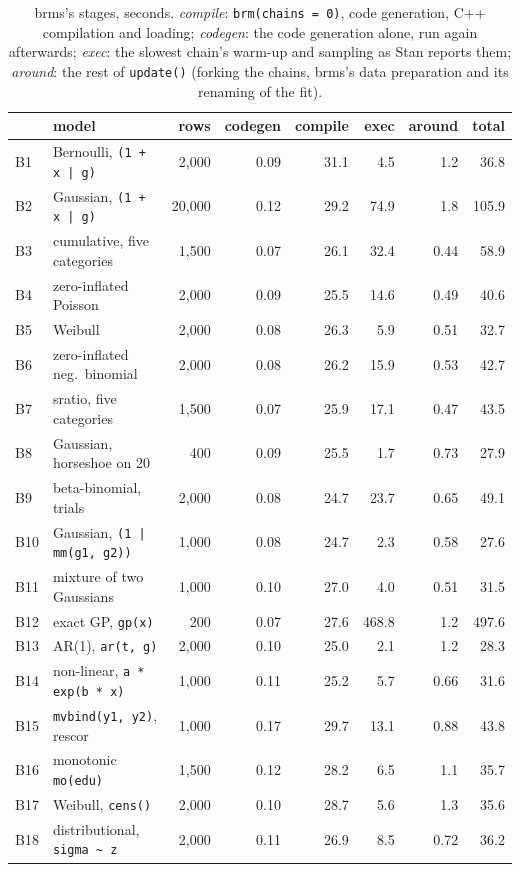 \documentclass[11pt]{article}
\newcommand{\code}[1]{\texttt{#1}}
\begin{document}
\begin{table}[H]
\footnotesize
\setlength{\tabcolsep}{4pt}
\begin{center}
\begin{tabular}{@{}llrrrrrr@{}}
\toprule
& model & rows & codegen & compile & exec & around & total \\
\midrule
B1 & Bernoulli, \code{(1 + x | g)} & 2,000 & 0.09 & 31.1 & 4.5 & 1.2 & 36.8 \\
B2 & Gaussian, \code{(1 + x | g)} & 20,000 & 0.12 & 29.2 & 74.9 & 1.8 & 105.9 \\
B3 & cumulative, five categories & 1,500 & 0.07 & 26.1 & 32.4 & 0.44 & 58.9 \\
B4 & zero-inflated Poisson & 2,000 & 0.09 & 25.5 & 14.6 & 0.49 & 40.6 \\
B5 & Weibull & 2,000 & 0.08 & 26.3 & 5.9 & 0.51 & 32.7 \\
B6 & zero-inflated neg.\ binomial & 2,000 & 0.08 & 26.2 & 15.9 & 0.53 & 42.7 \\
B7 & sratio, five categories & 1,500 & 0.07 & 25.9 & 17.1 & 0.47 & 43.5 \\
B8 & Gaussian, horseshoe on 20 & 400 & 0.09 & 25.5 & 1.7 & 0.73 & 27.9 \\
B9 & beta-binomial, trials & 2,000 & 0.08 & 24.7 & 23.7 & 0.65 & 49.1 \\
B10 & Gaussian, \code{(1 | mm(g1, g2))} & 1,000 & 0.08 & 24.7 & 2.3 & 0.58 & 27.6 \\
B11 & mixture of two Gaussians & 1,000 & 0.10 & 27.0 & 4.0 & 0.51 & 31.5 \\
B12 & exact GP, \code{gp(x)} & 200 & 0.07 & 27.6 & 468.8 & 1.2 & 497.6 \\
B13 & AR(1), \code{ar(t, g)} & 2,000 & 0.10 & 25.0 & 2.1 & 1.2 & 28.3 \\
B14 & non-linear, \code{a * exp(b * x)} & 1,000 & 0.11 & 25.2 & 5.7 & 0.66 & 31.6 \\
B15 & \code{mvbind(y1, y2)}, rescor & 1,000 & 0.17 & 29.7 & 13.1 & 0.88 & 43.8 \\
B16 & monotonic \code{mo(edu)} & 1,500 & 0.12 & 28.2 & 6.5 & 1.1 & 35.7 \\
B17 & Weibull, \code{cens()} & 2,000 & 0.10 & 28.7 & 5.6 & 1.3 & 35.6 \\
B18 & distributional, \code{sigma \textasciitilde{} z} & 2,000 & 0.11 & 26.9 & 8.5 & 0.72 & 36.2 \\
\bottomrule
\end{tabular}\end{center}
\caption{\small brms's stages, seconds. \emph{compile}: \code{brm(chains = 0)}, code generation, C++ compilation and loading; \emph{codegen}: the code generation alone, run again afterwards; \emph{exec}: the slowest chain's warm-up and sampling as Stan reports them; \emph{around}: the rest of \code{update()} (forking the chains, brms's data preparation and its renaming of the fit).}\label{tab:brms}
\end{table}
\end{document}
